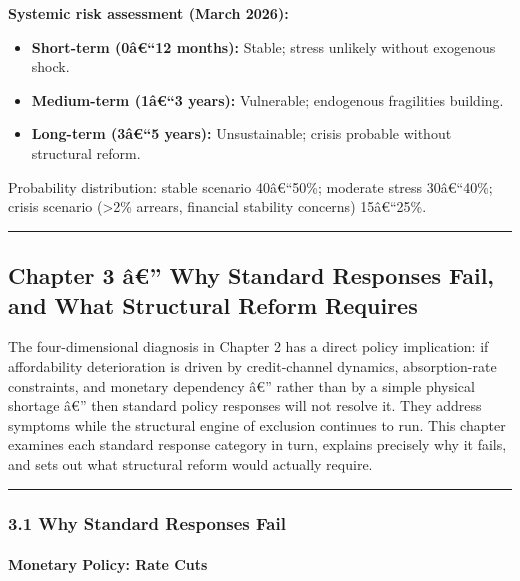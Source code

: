 \textbf{Systemic risk assessment (March 2026):}

\begin{itemize}
\tightlist
\item
  \textbf{Short-term (0â€``12 months):} Stable; stress unlikely without
  exogenous shock.
\item
  \textbf{Medium-term (1â€``3 years):} Vulnerable; endogenous
  fragilities building.
\item
  \textbf{Long-term (3â€``5 years):} Unsustainable; crisis probable
  without structural reform.
\end{itemize}

Probability distribution: stable scenario 40â€``50\%; moderate stress
30â€``40\%; crisis scenario (\textgreater2\% arrears, financial
stability concerns) 15â€``25\%.

\begin{center}\rule{0.5\linewidth}{0.5pt}\end{center}

\protect{}\label{chapter-3}
\subsection{Chapter 3 â€'' Why Standard Responses Fail, and What
Structural Reform
Requires}\label{chapter-3-uxe2-why-standard-responses-fail-and-what-structural-reform-requires}

The four-dimensional diagnosis in Chapter 2 has a direct policy
implication: if affordability deterioration is driven by credit-channel
dynamics, absorption-rate constraints, and monetary dependency â€''
rather than by a simple physical shortage â€'' then standard policy
responses will not resolve it. They address symptoms while the
structural engine of exclusion continues to run. This chapter examines
each standard response category in turn, explains precisely why it
fails, and sets out what structural reform would actually require.

\begin{center}\rule{0.5\linewidth}{0.5pt}\end{center}

\subsubsection{3.1 Why Standard Responses
Fail}\label{why-standard-responses-fail}

\paragraph{Monetary Policy: Rate Cuts}\label{monetary-policy-rate-cuts}

